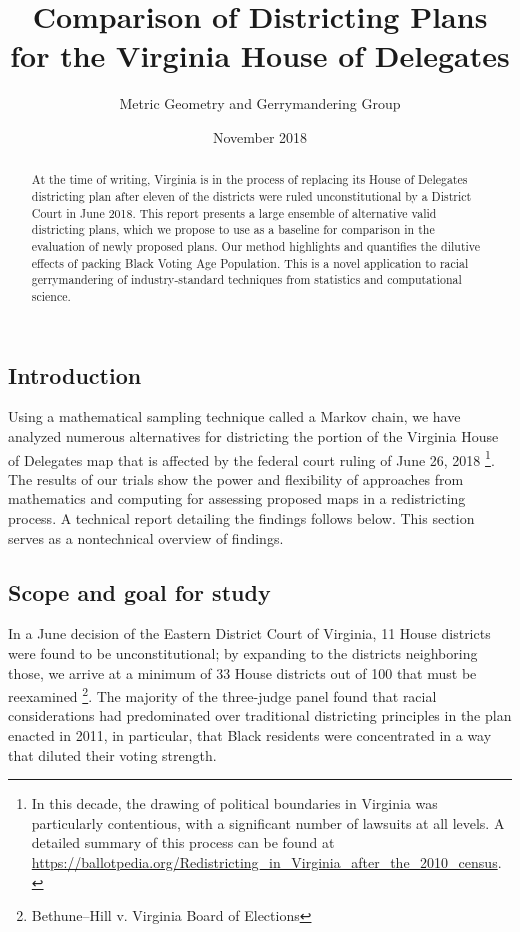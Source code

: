 \documentclass{mgggarticle}
\title{Comparison of Districting Plans\\ for the Virginia House of Delegates}
\author{Metric Geometry and Gerrymandering Group}
\date{November 2018}
\begin{document}
\begin{titlepage}

\maketitle

\begin{abstract}
At the time of writing, Virginia is in the process of replacing its House of Delegates districting
plan after eleven of the districts were ruled unconstitutional by a District Court in June 2018.
This report presents a large ensemble of alternative valid districting plans, which we propose
to use as a baseline for comparison in the evaluation of newly proposed plans. Our method
highlights and quantifies the dilutive effects of packing Black Voting Age Population.
This is a novel application to racial gerrymandering of industry-standard techniques from
statistics and computational science.
\end{abstract}

\tableofcontents

\end{titlepage}


\subsection{Introduction}

Using a mathematical sampling technique called a Markov chain, we have analyzed numerous
alternatives for districting the portion of the Virginia House of Delegates map that is affected by
the federal court ruling of June 26, 2018 \footnote{In this decade, the drawing of political boundaries in Virginia was particularly
contentious, with a significant number of lawsuits at all levels. A detailed summary of this process can be found at
\url{https://ballotpedia.org/Redistricting_in_Virginia_after_the_2010_census}.}. The results of our trials show the power and flexibility
of approaches from mathematics and computing for assessing proposed maps in a redistricting
process. A technical report detailing the findings follows below. This section serves as a nontechnical
overview of findings.

\subsection{Scope and goal for study}

In a June decision of the Eastern District Court of Virginia, 11 House districts were found to be
unconstitutional; by expanding to the districts neighboring those, we arrive at a minimum of 33
House districts out of 100 that must be reexamined \footnote{Bethune–Hill v. Virginia Board of Elections}.
The majority of the three-judge panel found that racial considerations had predominated over
traditional districting principles in the plan enacted in 2011, in particular, that Black residents
were concentrated in a way that diluted their voting strength.
\end{document}
